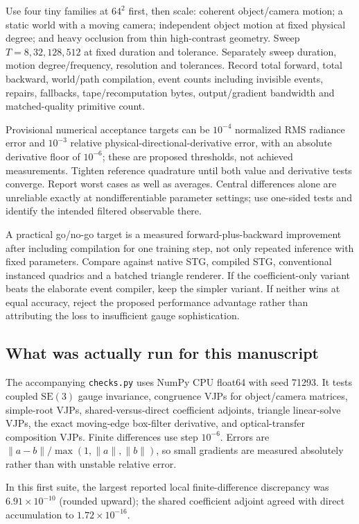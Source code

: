\documentclass[10pt,letterpaper]{article}
\theoremstyle{remark}\newtheorem{counterexample}[proposition]{Counterexample}
\newcommand{\SE}{\mathrm{SE}}
\begin{document}
Use four tiny families at $64^2$ first, then scale: coherent object/camera motion; a static world with a moving camera; independent object motion at fixed physical degree; and heavy occlusion from thin high-contrast geometry. Sweep $T=8,32,128,512$ at fixed duration and tolerance. Separately sweep duration, motion degree/frequency, resolution and tolerances. Record total forward, total backward, world/path compilation, event counts including invisible events, repairs, fallbacks, tape/recomputation bytes, output/gradient bandwidth and matched-quality primitive count.

Provisional numerical acceptance targets can be $10^{-4}$ normalized RMS radiance error and $10^{-3}$ relative physical-directional-derivative error, with an absolute derivative floor of $10^{-6}$; these are proposed thresholds, not achieved measurements. Tighten reference quadrature until both value and derivative tests converge. Report worst cases as well as averages. Central differences alone are unreliable exactly at nondifferentiable parameter settings; use one-sided tests and identify the intended filtered observable there.

A practical go/no-go target is a measured forward-plus-backward improvement after including compilation for one training step, not only repeated inference with fixed parameters. Compare against native STG, compiled STG, conventional instanced quadrics and a batched triangle renderer. If the coefficient-only variant beats the elaborate event compiler, keep the simpler variant. If neither wins at equal accuracy, reject the proposed performance advantage rather than attributing the loss to insufficient gauge sophistication.

\subsection{What was actually run for this manuscript}
The accompanying \texttt{checks.py} uses NumPy CPU float64 with seed 71293. It tests coupled $\SE(3)$ gauge invariance, congruence VJPs for object/camera matrices, simple-root VJPs, shared-versus-direct coefficient adjoints, triangle linear-solve VJPs, the exact moving-edge box-filter derivative, and optical-transfer composition VJPs. Finite differences use step $10^{-6}$. Errors are $\|a-b\|/\max(1,\|a\|,\|b\|)$, so small gradients are measured absolutely rather than with unstable relative error.

In this first suite, the largest reported local finite-difference discrepancy was $6.91\times10^{-10}$ (rounded upward); the shared coefficient adjoint agreed with direct accumulation to $1.72\times10^{-16}$.
\end{document}
